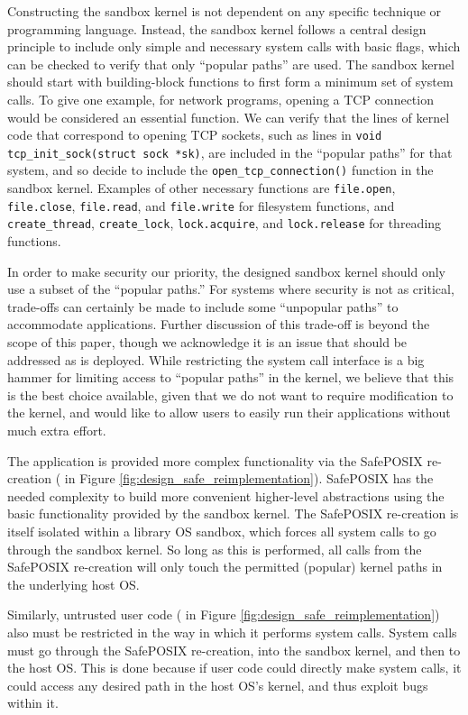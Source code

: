 Constructing the sandbox kernel is not dependent on any specific technique or programming language.
Instead, the sandbox kernel follows a central design principle to include only simple and necessary system calls with basic flags,
which can be checked to verify that only ``popular paths'' are used.
The sandbox kernel should start with building-block functions to first form a minimum set of system calls.
To give one example, for network programs, opening a TCP connection would be considered an essential function.
We can verify that the lines of kernel code that correspond
to opening TCP sockets, such as lines in \texttt{void tcp\_init\_sock(struct sock *sk)},  are included in the ``popular paths'' for that system, and so decide to include the \texttt{open\_tcp\_connection()} function
in the sandbox kernel.
Examples of other necessary functions are \texttt{file.open}, \texttt{file.close}, \texttt{file.read}, and \texttt{file.write} for filesystem
functions, and \texttt{create\_thread}, \texttt{create\_lock}, \texttt{lock.acquire}, and \texttt{lock.release} for threading functions.

In order to make security our priority, the designed sandbox kernel should only use a subset of the ``popular paths.''
For systems where security is not as critical, trade-offs can certainly be made to include some ``unpopular paths'' to accommodate applications.
Further discussion of this trade-off is beyond the scope of this paper,
though we acknowledge it is an issue that should be addressed as \lip is deployed.
While restricting the system call interface is a big hammer for limiting access to ``popular paths'' in the kernel,
we believe that this is the best choice available, given that we do not want to require modification to the kernel, and
would like to allow users to easily run their applications without much extra effort.

The application is provided more complex functionality via the SafePOSIX re-creation
( in Figure \ref{fig:design_safe_reimplementation}).
SafePOSIX has the needed complexity to build more convenient higher-level
abstractions using the basic functionality provided by the sandbox kernel.
The SafePOSIX re-creation is itself isolated within a library OS sandbox, which
forces all system calls to go through the sandbox kernel.
So long as this is performed, all calls from the SafePOSIX re-creation will only
touch the permitted (popular) kernel paths in the underlying host OS.

Similarly, untrusted user code ( in Figure \ref{fig:design_safe_reimplementation})
 also must be restricted in the way in which it performs system calls.
System calls must go through the SafePOSIX re-creation, into the sandbox kernel, and then to the host OS.
This is done because if user code could directly make system calls, it could
access any desired path in the host OS's kernel,
and thus exploit bugs within it.

